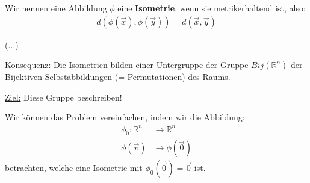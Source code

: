 \documentclass{report}
\newcommand*{\newpar}{\par\vspace{\baselineskip}\noindent}
\newcommand{\tbf}[1]{\textbf{#1}}
\newcommand{\ul}[1]{\underline{#1}}
\newcommand{\bR}{\mathbb{R}}
\newcommand{\vv}{\vec{v}}
\newcommand{\vx}{\vec{x}}
\newcommand{\vy}{\vec{y}}
\newcommand{\vz}{\vec{0}}
\begin{document}
\begin{definition}
Wir nennen eine Abbildung $\phi$ eine \tbf{Isometrie}, wenn sie metrikerhaltend ist, also:
\begin{align*}
 d(\phi(\vx), \phi(\vy)) = d(\vx, \vy)
\end{align*}

\end{definition}
\newpar
($\hdots$)
\newpar
\ul{Konsequenz:} Die Isometrien bilden einer Untergruppe der Gruppe $Bij(\bR^n)$ der Bijektiven Selbstabbildungen (= Permutationen) des Raums.
\newpar
\ul{Ziel:} Diese Gruppe beschreiben!
\newpar
Wir können das Problem vereinfachen, indem wir die Abbildung:
\begin{align*}
 \phi_0 : \bR^n &\to \bR^n\\
 \phi(\vv) &\to \phi(\vz)
\end{align*}
betrachten, welche eine Isometrie mit $\phi_0(\vz) = \vz$ ist.
\end{document}
